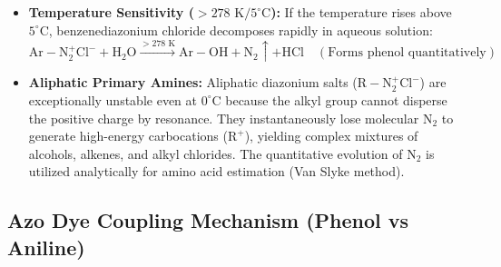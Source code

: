 \documentclass[10pt,a4paper]{article}
\begin{document}
\begin{trapbox}
\begin{itemize}
  \item \textbf{Temperature Sensitivity ($> 278\text{ K} / 5^\circ\mathrm{C}$):} If the temperature rises above $5^\circ\mathrm{C}$, benzenediazonium chloride decomposes rapidly in aqueous solution:
  \begin{equation}
    \mathrm{Ar-N_2^+Cl^-} + \mathrm{H_2O} \xrightarrow{> 278\text{ K}} \mathrm{Ar-OH} + \mathrm{N_2}\uparrow + \mathrm{HCl} \quad (\text{Forms phenol quantitatively})
  \end{equation}
  \item \textbf{Aliphatic Primary Amines:} Aliphatic diazonium salts ($\mathrm{R-N_2^+Cl^-}$) are exceptionally unstable even at $0^\circ\mathrm{C}$ because the alkyl group cannot disperse the positive charge by resonance. They instantaneously lose molecular $\mathrm{N_2}$ to generate high-energy carbocations ($\mathrm{R^+}$), yielding complex mixtures of alcohols, alkenes, and alkyl chlorides. The quantitative evolution of $\mathrm{N_2}$ is utilized analytically for amino acid estimation (Van Slyke method).
\end{itemize}
\end{trapbox}

\subsection{Azo Dye Coupling Mechanism (Phenol vs Aniline)}
\end{document}
